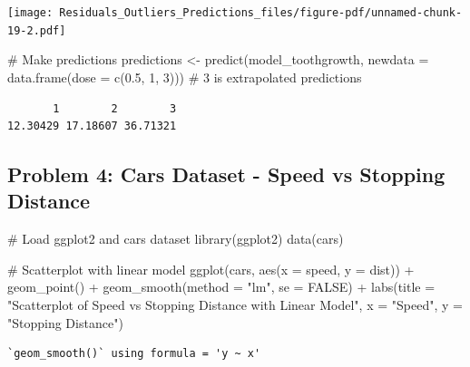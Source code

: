 \documentclass[
  letterpaper,
  DIV=11,
  numbers=noendperiod]{scrreprt}
\newenvironment{Shaded}{\begin{snugshade}}{\end{snugshade}}
\newcommand{\AttributeTok}[1]{\textcolor[rgb]{0.40,0.45,0.13}{#1}}
\newcommand{\CommentTok}[1]{\textcolor[rgb]{0.37,0.37,0.37}{#1}}
\newcommand{\ConstantTok}[1]{\textcolor[rgb]{0.56,0.35,0.01}{#1}}
\newcommand{\DecValTok}[1]{\textcolor[rgb]{0.68,0.00,0.00}{#1}}
\newcommand{\FloatTok}[1]{\textcolor[rgb]{0.68,0.00,0.00}{#1}}
\newcommand{\FunctionTok}[1]{\textcolor[rgb]{0.28,0.35,0.67}{#1}}
\newcommand{\NormalTok}[1]{\textcolor[rgb]{0.00,0.23,0.31}{#1}}
\newcommand{\OtherTok}[1]{\textcolor[rgb]{0.00,0.23,0.31}{#1}}
\newcommand{\SpecialCharTok}[1]{\textcolor[rgb]{0.37,0.37,0.37}{#1}}
\newcommand{\StringTok}[1]{\textcolor[rgb]{0.13,0.47,0.30}{#1}}
\begin{document}
\texttt{[image: Residuals\_Outliers\_Predictions\_files/figure-pdf/unnamed-chunk-19-2.pdf]}

\begin{Shaded}
\begin{Highlighting}[]
\CommentTok{\# Make predictions}
\NormalTok{predictions }\OtherTok{\textless{}{-}} \FunctionTok{predict}\NormalTok{(model\_toothgrowth, }\AttributeTok{newdata =} \FunctionTok{data.frame}\NormalTok{(}\AttributeTok{dose =} \FunctionTok{c}\NormalTok{(}\FloatTok{0.5}\NormalTok{, }\DecValTok{1}\NormalTok{, }\DecValTok{3}\NormalTok{))) }\CommentTok{\# 3 is extrapolated}
\NormalTok{predictions}
\end{Highlighting}
\end{Shaded}

\begin{verbatim}
       1        2        3 
12.30429 17.18607 36.71321 
\end{verbatim}

\subsection*{Problem 4: Cars Dataset - Speed vs Stopping
Distance}\label{problem-4-cars-dataset---speed-vs-stopping-distance-2}

\begin{Shaded}
\begin{Highlighting}[]
\CommentTok{\# Load ggplot2 and cars dataset}
\FunctionTok{library}\NormalTok{(ggplot2)}
\FunctionTok{data}\NormalTok{(cars)}

\CommentTok{\# Scatterplot with linear model}
\FunctionTok{ggplot}\NormalTok{(cars, }\FunctionTok{aes}\NormalTok{(}\AttributeTok{x =}\NormalTok{ speed, }\AttributeTok{y =}\NormalTok{ dist)) }\SpecialCharTok{+}
  \FunctionTok{geom\_point}\NormalTok{() }\SpecialCharTok{+}
  \FunctionTok{geom\_smooth}\NormalTok{(}\AttributeTok{method =} \StringTok{"lm"}\NormalTok{, }\AttributeTok{se =} \ConstantTok{FALSE}\NormalTok{) }\SpecialCharTok{+}
  \FunctionTok{labs}\NormalTok{(}\AttributeTok{title =} \StringTok{"Scatterplot of Speed vs Stopping Distance with Linear Model"}\NormalTok{, }\AttributeTok{x =} \StringTok{"Speed"}\NormalTok{, }\AttributeTok{y =} \StringTok{"Stopping Distance"}\NormalTok{)}
\end{Highlighting}
\end{Shaded}

\begin{verbatim}
`geom_smooth()` using formula = 'y ~ x'
\end{verbatim}
\end{document}
